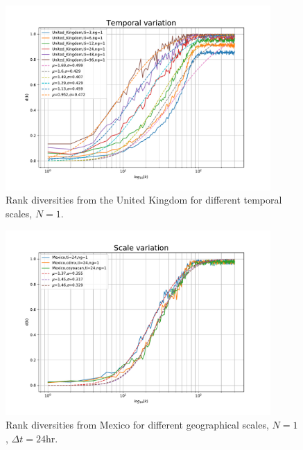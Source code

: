 \documentclass[12pt]{article}
\begin{document}
\begin{figure}[htbp]
\begin{center}
\includegraphics[width=0.9\textwidth]{img/time-United_Kingdom}
\caption{Rank diversities from the United Kingdom for different temporal scales, $N = 1$.}
\label{fig:time-United_Kingdom}
\end{center}
\end{figure}


\begin{figure}[htbp]
\begin{center}
\includegraphics[width=0.9\textwidth]{img/geo-mx-24hrs}
\caption{Rank diversities from Mexico for different geographical scales, $N = 1$, $\Delta t = 24$hr.}
\label{fig:geo-mx-24hrs}
\end{center}
\end{figure}
\end{document}
